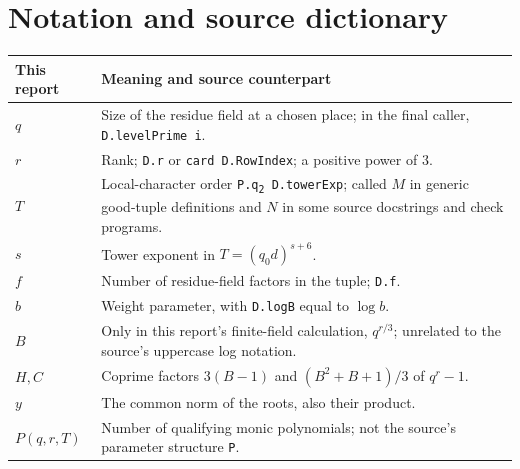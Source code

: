 \documentclass[11pt,a4paper]{article}
\newcommand{\src}[1]{\nolinkurl{#1}}
\theoremstyle{definition}
\theoremstyle{remark}
\begin{document}
\section{Notation and source dictionary}
\begin{center}
\small
\begin{tabularx}{\textwidth}{@{}p{}Y@{}}
\toprule
This report & Meaning and source counterpart \\
\midrule
$q$ & Size of the residue field at a chosen place; in the final caller, \texttt{D.levelPrime i}. \\
$r$ & Rank; \src{D.r} or \texttt{card D.RowIndex}; a positive power of $3$. \\
$T$ & Local-character order \texttt{P.q\textsubscript{2}\ D.towerExp}; called $M$ in generic good-tuple definitions and $N$ in some source docstrings and check programs. \\
$s$ & Tower exponent in $T=(q_0d)^{s+6}$. \\
$f$ & Number of residue-field factors in the tuple; \src{D.f}. \\
$b$ & Weight parameter, with \src{D.logB} equal to $\log b$. \\
$B$ & Only in this report's finite-field calculation, $q^{r/3}$; unrelated to the source's uppercase log notation. \\
$H,C$ & Coprime factors $3(B-1)$ and $(B^2+B+1)/3$ of $q^r-1$. \\
$y$ & The common norm of the roots, also their product. \\
$P(q,r,T)$ & Number of qualifying monic polynomials; not the source's parameter structure \src{P}. \\
\bottomrule
\end{tabularx}
\end{center}
\end{document}
